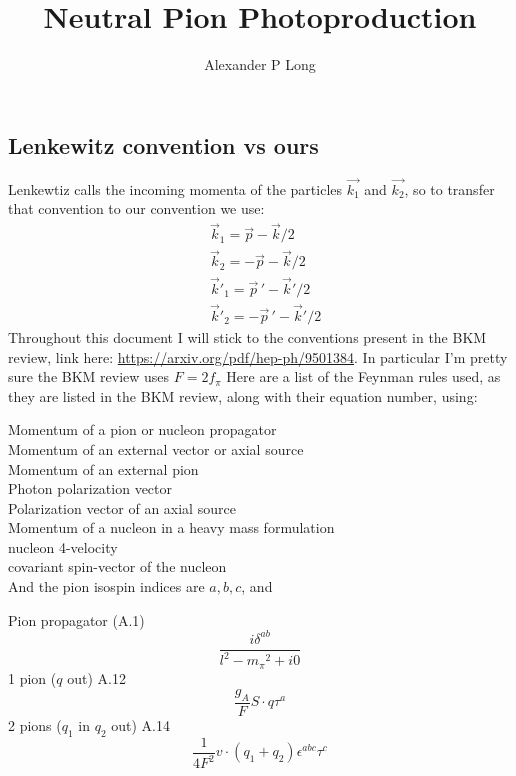 \documentclass[11pt]{article}
\author{Alexander P Long}
\title{Neutral Pion Photoproduction}
\newcommand\ddfrac[2]{\frac{\displaystyle #1}{\displaystyle #2}}
\newcommand{\mpi}{\ensuremath{m_\pi}}
\begin{document}
\maketitle
\subsection{Lenkewitz convention vs ours}
Lenkewtiz calls the incoming momenta of the particles $\vec{k_1}$ and
$\vec{k_2}$, so to transfer that convention to our convention we use:
\begin{align}
	 & \vec{k}_1 =\vec{p} - \vec{k}/2       \\
	 & \vec{k}_2 =-\vec{p} - \vec{k}/2      \\
	 & \vec{k}'_1= \vec{p}\,' - \vec{k}'/2  \\
	 & \vec{k}'_2= -\vec{p}\,' - \vec{k}'/2
\end{align}
Throughout this document I will stick to the conventions present in
the BKM review, link here:
\href{https://arxiv.org/pdf/hep-ph/9501384}{https://arxiv.org/pdf/hep-ph/9501384}.
In particular I'm pretty sure the BKM review uses $F=2 f_\pi$
Here are a list of the Feynman rules used, as they are listed in the
BKM review, along with their equation number, using:\par
{} Momentum of a pion or nucleon propagator\\
 Momentum of an external vector or axial source\\
 Momentum of an external pion\\
\makebox[1.5cm]{$\epsilon$} Photon polarization vector\\
 Polarization vector of an axial source\\
 Momentum of a nucleon in a heavy mass formulation\\
 nucleon 4-velocity\\
 covariant spin-vector of the nucleon\\
And the pion isospin indices are $a,b,c$, and \par
Pion propagator (A.1)
\begin{equation}
	\ddfrac{i \delta^{ab}}{l^2-\mpi^2+i0}
\end{equation}
1 pion ($q$ out) A.12
\begin{equation}
	\frac{g_A}{F} S \cdot q \tau^a
\end{equation}
2 pions ($q_1$ in $q_2$ out) A.14
\begin{equation}
	\frac{1}{4 F^2} v \cdot (q_1 + q_2) \epsilon^{abc} \tau^c
\end{equation}
\end{document}
